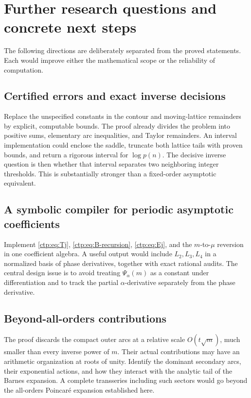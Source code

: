 \documentclass[11pt,a4paper]{article}
\numberwithin{equation}{section}
\theoremstyle{definition}
\theoremstyle{remark}
\begin{document}
\section{Further research questions and concrete next steps}
\label{ctp:sec:future}
The following directions are deliberately separated from the proved
statements. Each would improve either the mathematical scope or the
reliability of computation.

\subsection{Certified errors and exact inverse decisions}
Replace the unspecified constants in the contour and moving-lattice
remainders by explicit, computable bounds. The proof already divides the
problem into positive sums, elementary arc inequalities, and Taylor
remainders. An interval implementation could enclose the saddle, truncate
both lattice tails with proven bounds, and return a rigorous interval for
$\log p(n)$. The decisive inverse question is then whether that interval
separates two neighboring integer thresholds. This is substantially
stronger than a fixed-order asymptotic equivalent.

\subsection{A symbolic compiler for periodic asymptotic coefficients}
Implement \eqref{ctp:eq:Tj}, \eqref{ctp:eq:B-recursion}, \eqref{ctp:eq:Ej}, and the
$m$-to-$\mu$ reversion in one coefficient algebra. A useful output would
include $L_2,L_3,L_4$ in a normalized basis of phase derivatives, together
with exact rational audits. The central design issue is to avoid treating
$\Psi_\alpha(m)$ as a constant under differentiation and to track the
partial $\alpha$-derivative separately from the phase derivative.

\subsection{Beyond-all-orders contributions}
The proof discards the compact outer arcs at a relative scale
$O(t\sqrt m)$, much smaller than every inverse power of $m$. Their actual
contributions may have an arithmetic organization at roots of unity.
Identify the dominant secondary arcs, their exponential actions, and how
they interact with the analytic tail of the Barnes expansion. A complete
transseries including such sectors would go beyond the all-orders
Poincar\'e expansion established here.
\end{document}
